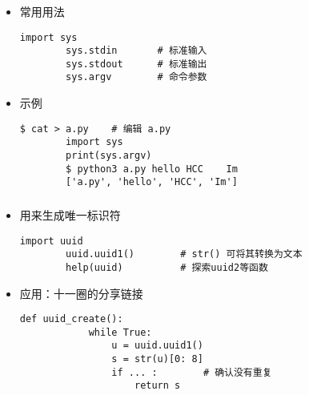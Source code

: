 \begin{frame} [fragile]
	\frametitle{}
	\begin{itemize}
	\item 常用用法
		\begin{lstlisting}[style=pythonstyle, gobble=8, texcl]
		import sys
		sys.stdin		# 标准输入
		sys.stdout		# 标准输出
		sys.argv		# 命令参数
		\end{lstlisting}
	\item {}示例
		\begin{lstlisting}[style=pythonstyle, gobble=8, texcl, escapechar=@]
		$ cat > a.py	# 编辑 a.py
		import sys
		print(sys.argv)
		$ python3 a.py hello HCC    Im
		['a.py', 'hello', 'HCC', 'Im']
		\end{lstlisting}
	\end{itemize}
\end{frame}

\begin{frame} [fragile]
	\frametitle{}
	\linespread{1.25}
	\begin{itemize}
	\item {}用来生成唯一标识符
		\begin{lstlisting}[style=pythonstyle, gobble=8, texcl, escapechar=@]
		import uuid
		uuid.uuid1()		# str() 可将其转换为文本
		help(uuid)			# 探索uuid2等函数
		\end{lstlisting}
	\item 应用：十一圈的分享链接
		\begin{lstlisting}[style=pythonstyle, gobble=8, texcl, escapechar=@]
		def uuid_create():
			while True:
				u = uuid.uuid1()
				s = str(u)[0: 8]
				if ... :		# 确认没有重复
					return s
		\end{lstlisting}
	\end{itemize}
\end{frame}


